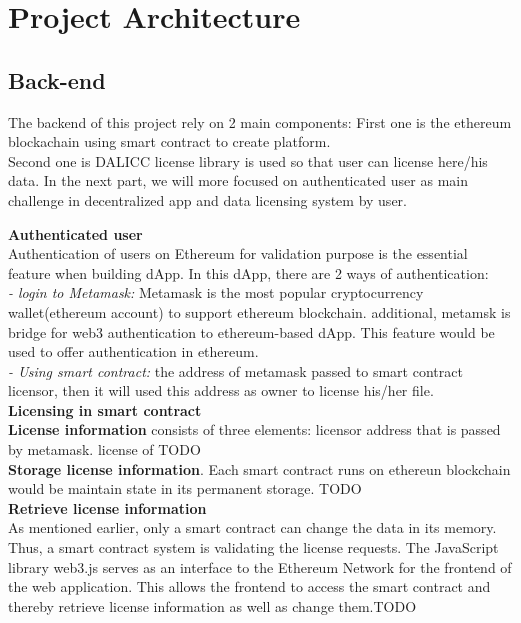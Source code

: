 \begin{itemize}
\begin{center}
\begin{figure}[htb!]
	\end{figure}
	
\end{center}

\end{itemize}
\section{Project Architecture}
\subsection{Back-end} The backend of this project rely on 2 main components: First one is the ethereum blockachain using smart contract to create platform. \\
Second one is DALICC license library is used so that user can license here/his data. In the next part, we will more focused on authenticated user as main challenge in decentralized app and data licensing system by user. 

\textbf{Authenticated user} \\
Authentication of users on Ethereum for validation purpose is the essential feature when building dApp. 
In this dApp, there are 2 ways of authentication: \\
\textit{- login to Metamask:} Metamask is the most popular cryptocurrency wallet(ethereum account) to support ethereum blockchain. additional, metamsk is bridge for web3 authentication to ethereum-based dApp. This feature would be used to offer authentication in ethereum.  \\
\textit{- Using smart contract: }the address of metamask passed to smart contract licensor, then it will
used this address as owner to license his/her file. \\

\textbf{Licensing in smart contract} \\
\textbf{License information} consists of three elements: licensor address that is passed by metamask. license of TODO\\
\textbf{Storage license information}. Each smart contract runs on ethereun blockchain would be maintain state in its permanent storage. TODO\\
\textbf{Retrieve license information}\\
As mentioned earlier, only a smart contract can change the data in its memory.
Thus, a smart contract system is validating the license requests. The JavaScript
library web3.js serves as an interface to the Ethereum Network for the frontend
of the web application. This allows the frontend to access the smart contract and
thereby retrieve license information as well as change them.TODO\\

